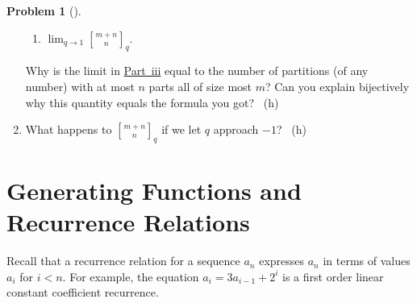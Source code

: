 \documentclass[10pt,]{book}
\theoremstyle{plain}
\theoremstyle{definition}
\newtheorem{activity}[project]{Problem}
\theoremstyle{definition}
\numberwithin{equation}{chapter}
\newcommand{\qchoose}[2]{\genfrac{[}{]}{0pt}{}{#1}{#2}_q}
\newcommand{\lt}{<}
\begin{document}
\begin{activity}[]
\begin{enumerate}[font=\bfseries,label=(\alph*),ref=\alph*]
\begin{enumerate}[label=(\roman*)]
\item\hypertarget{q-binomial-lim}{}\(\displaystyle\lim_{q\rightarrow 1} \qchoose{m+n}{n}\).%
\end{enumerate}
 Why is the limit in \hyperlink{q-binomial-lim}{Part~iii} equal to the number of partitions (of any number) with at most \(n\) parts all of size most \(m\)? Can you explain bijectively why this quantity equals the formula you got?%
~{\tiny (h)}\item\label{task-156}  \hypertarget{p-1215}{}%
What happens to \(\qchoose{m+n}{n}\) if we let \(q\) approach \(-1\)?%
~{\tiny (h)}\end{enumerate}
\end{activity}
\typeout{************************************************}
\typeout{************************************************}
\section[{Generating Functions and Recurrence Relations}]{Generating Functions and Recurrence Relations}\label{sec_genfns-recurrence}
\hypertarget{p-1223}{}%
Recall that a recurrence relation for a sequence \(a_n\) expresses \(a_n\) in terms of values \(a_i\) for \(i\lt n\). For example, the equation \(a_i=3a_{i-1} +2^i\) is a first order linear constant coefficient recurrence.%
\typeout{************************************************}
\typeout{************************************************}
\end{document}
